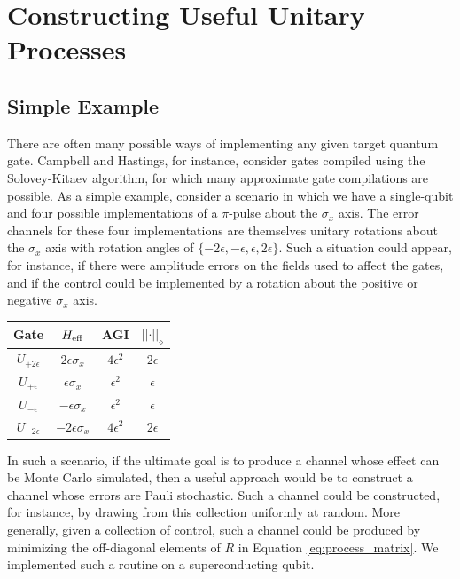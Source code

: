 \documentclass[aps,nofootinbib,pra,notitlepage,twocolumn]{revtex4-1}
\begin{document}
\section{Constructing Useful Unitary Processes}
\label{sec:mixed_unitary_processes}
\subsection{Simple Example}
\label{sec:simple_example}
There are often many possible ways of implementing any given target quantum gate. Campbell and Hastings, for instance, consider gates compiled using the Solovey-Kitaev algorithm, for which many approximate gate compilations are possible.\cite{Campbell2017, 1612.01011} As a simple example, consider a scenario in which we have a single-qubit and four possible implementations of a $\pi$-pulse about the $\sigma_x$ axis. The error channels for these four implementations are themselves unitary rotations about the $\sigma_x$ axis with rotation angles of $\{-2\epsilon, -\epsilon, \epsilon, 2\epsilon\}$. Such a situation could appear, for instance, if there were amplitude errors on the fields used to affect the gates, and if the control could be implemented by a rotation about the positive or negative $\sigma_x$ axis.

\begin{center}
\begin{tabular}{cccc}
	Gate & $H_{\rm{eff}}$ & AGI & $\vert\vert\cdot\vert\vert_\diamond$ \\
\hline
	$U_{+2\epsilon}$ & $2\epsilon \sigma_x$ & $4\epsilon^2$ & $2\epsilon$\\
	$U_{+\epsilon}$ & $\epsilon \sigma_x$ & $\epsilon^2$ & $\epsilon$ \\
	$U_{-\epsilon}$ & $-\epsilon \sigma_x$ & $\epsilon^2$ & $\epsilon$ \\
	$U_{-2\epsilon}$ & $-2\epsilon \sigma_x$ & $4\epsilon^2$ & $2\epsilon$ 
\end{tabular}
\end{center}

In such a scenario, if the ultimate goal is to produce a channel whose effect can be Monte Carlo simulated, then a useful approach would be to construct a channel whose errors are Pauli stochastic. Such a channel could be constructed, for instance, by drawing from this collection uniformly at random. More generally, given a collection of control, such a channel could be produced by minimizing the off-diagonal elements of $R$ in Equation \ref{eq:process_matrix}. We implemented such a routine on a superconducting qubit.
\end{document}
